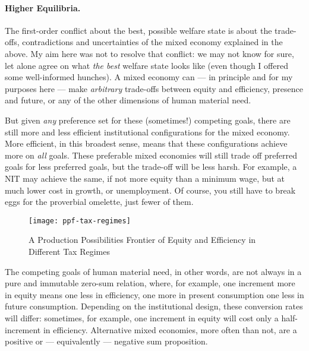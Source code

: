 \paragraph[Higher Equilibria]{Higher Equilibria.} The first-order conflict about the best, possible welfare state is about the trade-offs, contradictions and uncertainties of the mixed economy explained in the above.
My aim here was not to resolve that conflict:
we may not know for sure, let alone agree on what \emph{the best} welfare state looks like (even though I offered some well-informed hunches).
A mixed economy can --- in principle and for my purposes here --- make \emph{arbitrary} trade-offs between equity and efficiency, presence and future, or any of the other dimensions of human material need.


But given \emph{any} preference set for these (sometimes!) competing goals, there are still more and less efficient institutional configurations for the mixed economy.
More efficient, in this broadest sense, means that these configurations achieve more on \emph{all} goals.
These preferable mixed economies will still trade off preferred goals for less preferred goals, but the trade-off will be less harsh.
For example, a \gls{NIT} may achieve the same, if not more equity than a minimum wage, but at much lower cost in growth, or unemployment.
Of course, you still have to break eggs for the proverbial omelette, just fewer of them.


\begin{figure}[htbp]
	\centering
	\texttt{[image: ppf-tax-regimes]}
	\caption[Equity-Efficiency Trade-offs of Different Tax Regimes]{A Production Possibilities Frontier of Equity and Efficiency in Different Tax Regimes}
	\label{fig:ppf-tax-regimes} %
\end{figure}

The competing goals of human material need, in other words, are not always in a pure and immutable zero-sum relation, where, for example, one increment more in equity means one less in efficiency, one more in present consumption one less in future consumption.
Depending on the institutional design, these conversion rates will differ:
sometimes, for example, one increment in equity will cost only a half-increment in efficiency.
Alternative mixed economies, more often than not, are a positive or --- equivalently --- negative sum proposition.

